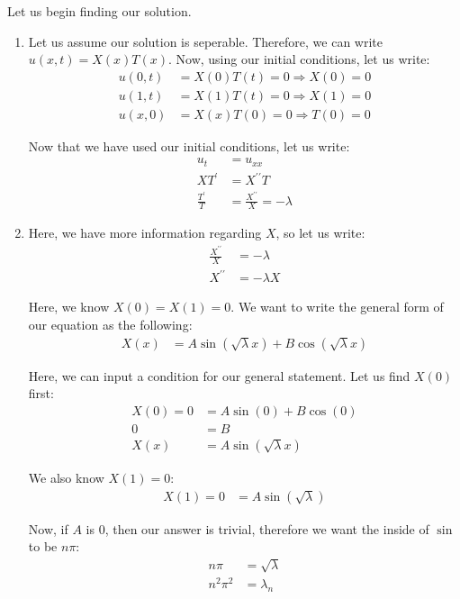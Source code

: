 \documentclass{article}
\begin{document}
\begin{enumerate}
Let us begin finding our solution.
\begin{enumerate}
  \item Let us assume our solution is seperable. Therefore, we can write $u(x, t) = X(x)T(x)$. Now, using our initial conditions, let us write:
  \begin{align}
    u(0, t) & = X(0)T(t) = 0 \Rightarrow X(0) = 0\\
    u(1, t) & = X(1)T(t) = 0 \Rightarrow X(1) = 0\\
    u(x, 0) & = X(x)T(0) = 0 \Rightarrow T(0) = 0
  \end{align}

  Now that we have used our initial conditions, let us write:
  \begin{align}
    u_t & = u_{xx}\\
    XT^\prime & = X^{\prime\prime}T\\
    \frac{T^\prime}{T} & = \frac{X^{\prime\prime}}{X} = -\lambda
  \end{align}

  \item Here, we have more information regarding $X$, so let us write:
  \begin{align}
    \frac{X^{\prime\prime}}{X} & = -\lambda\\
    X^{\prime\prime} & = -\lambda X
  \end{align}

  Here, we know $X(0) = X(1) = 0$. We want to write the general form of our equation as the following:
  \begin{align}
    X(x) & = A \sin\left( \sqrt \lambda x\right) + B \cos\left( \sqrt \lambda x\right)
  \end{align}

  Here, we can input a condition for our general statement. Let us find $X(0)$ first:
  \begin{align}
    X(0) = 0 & = A \sin(0) + B \cos(0)\\
    0 & = B\\
    X(x) & = A \sin(\sqrt \lambda x)
  \end{align}

  We also know $X(1) = 0$:
%
  \begin{align}
    X(1) = 0 & = A \sin(\sqrt \lambda)
  \end{align}

  Now, if $A$ is $0$, then our answer is trivial, therefore we want the inside of $\sin$ to be $n \pi$:
  \begin{align}
    n \pi & = \sqrt \lambda\\
    n^2 \pi^2 & = \lambda_n
  \end{align}


\end{enumerate}
\end{enumerate}
\end{document}
